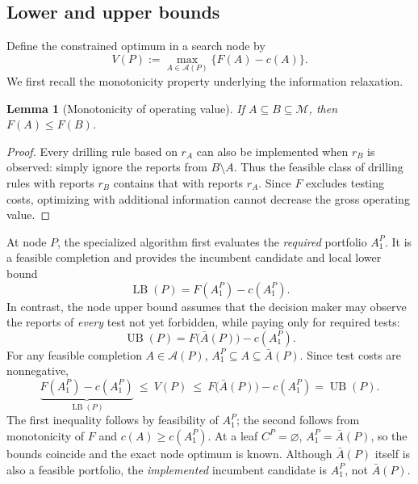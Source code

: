 \documentclass[11pt,a4paper]{article}
\newtheorem{lemma}{Lemma}
\newcommand{\calM}{\mathcal{M}}
\begin{document}
\subsection{Lower and upper bounds}\label{sec:bounds}
Define the constrained optimum in a search node by
\begin{equation}\label{eq:nodesubprob}
 V(P):=\max_{A\in\mathscr{A}(P)}\bigl\{F(A)-c(A)\bigr\}.
\end{equation}
We first recall the monotonicity property underlying the information relaxation.
\begin{lemma}[Monotonicity of operating value]\label{lem:monotone}
If $A\subseteq B\subseteq\calM$, then $F(A)\le F(B)$.
\end{lemma}
\begin{proof}
Every drilling rule based on $r_A$ can also be implemented when $r_B$ is observed: simply ignore the reports from $B\setminus A$. Thus the feasible class of drilling rules with reports $r_B$ contains that with reports $r_A$. Since $F$ excludes testing costs, optimizing with additional information cannot decrease the gross operating value.
\end{proof}

At node $P$, the specialized algorithm first evaluates the \emph{required} portfolio $A_1^P$. It is a feasible completion and provides the incumbent candidate and local lower bound
\begin{equation}\label{eq:lower}
 \boxed{\operatorname{LB}(P)=F(A_1^P)-c(A_1^P).}
\end{equation}
In contrast, the node upper bound assumes that the decision maker may observe the reports of \emph{every} test not yet forbidden, while paying only for required tests:
\begin{equation}\label{eq:upper}
 \boxed{\operatorname{UB}(P)=F\bigl(\bar A(P)\bigr)-c(A_1^P).}
\end{equation}
For any feasible completion $A\in\mathscr A(P)$, $A_1^P\subseteq A\subseteq\bar A(P)$. Since test costs are nonnegative,
\begin{equation}\label{eq:boundproof}
 \underbrace{F(A_1^P)-c(A_1^P)}_{\operatorname{LB}(P)}
 \ \le\ V(P)\ \le\
 F\bigl(\bar A(P)\bigr)-c(A_1^P)
 =\operatorname{UB}(P).
\end{equation}
The first inequality follows by feasibility of $A_1^P$; the second follows from monotonicity of $F$ and $c(A)\ge c(A_1^P)$. At a leaf $C^P=\varnothing$, $A_1^P=\bar A(P)$, so the bounds coincide and the exact node optimum is known. Although $\bar A(P)$ itself is also a feasible portfolio, the \emph{implemented} incumbent candidate is $A_1^P$, not $\bar A(P)$.
\end{document}
